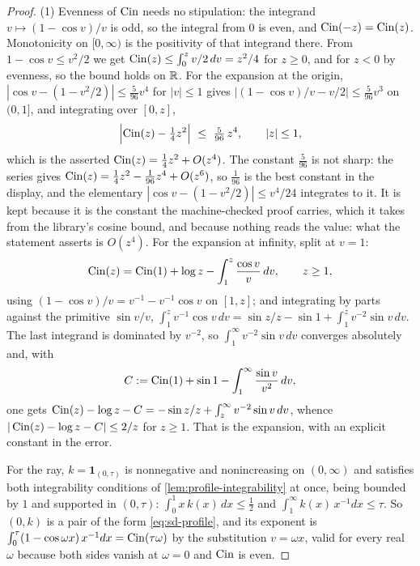 \begin{proof}
\leanok
(1) Evenness of $\operatorname{Cin}$ needs no stipulation: the integrand $v \mapsto (1 - \cos v)/v$ is odd,
so the integral from $0$ is even, and $\operatorname{Cin}(-z) = \operatorname{Cin}(z)$. Monotonicity on $[0,\infty)$ is the
positivity of that integrand there. From $1 - \cos v \le v^2/2$ we get
$\operatorname{Cin}(z) \le \int_0^z v/2\,dv = z^2/4$ for $z \ge 0$, and for $z < 0$ by evenness, so the bound
holds on $\mathbb{R}$. For the expansion at the origin, $|\cos v - (1 - v^2/2)| \le \tfrac{5}{96}v^4$
for $|v| \le 1$ gives $|(1-\cos v)/v - v/2| \le \tfrac{5}{96}v^3$ on $(0,1]$, and integrating
over $[0,z]$,
\[
  \Bigl|\Cin(z) - \tfrac14 z^2\Bigr| \ \le\ \tfrac{5}{96}\,z^4,
  \qquad |z| \le 1,
\]
which is the asserted $\operatorname{Cin}(z) = \tfrac14z^2 + O(z^4)$. The constant $\tfrac5{96}$ is not sharp:
the series gives $\operatorname{Cin}(z) = \tfrac14z^2 - \tfrac1{96}z^4 + O(z^6)$, so $\tfrac1{96}$ is the best
constant in the display, and the elementary $|\cos v - (1 - v^2/2)| \le v^4/24$ integrates to it.
It is kept because it is the constant the machine-checked proof carries, which it takes from the
library's cosine bound, and because nothing reads the value: what the statement asserts is
$O(z^4)$. For the expansion at infinity, split at
$v = 1$:
\[
  \operatorname{Cin}(z) = \operatorname{Cin}(1) + \log z - \int_1^z \frac{\cos v}{v}\,dv , \qquad z \ge 1,
\]
using $(1-\cos v)/v = v^{-1} - v^{-1}\cos v$ on $[1,z]$; and integrating by parts against the
primitive $\sin v/v$,
$\int_1^z v^{-1}\cos v\,dv = \sin z/z - \sin 1 + \int_1^z v^{-2}\sin v\,dv$. The last integrand
is dominated by $v^{-2}$, so $\int_1^\infty v^{-2}\sin v\,dv$ converges absolutely and, with
\[
  C := \operatorname{Cin}(1) + \sin 1 - \int_1^\infty \frac{\sin v}{v^2}\,dv ,
\]
one gets $\operatorname{Cin}(z) - \log z - C = -\sin z/z + \int_z^\infty v^{-2}\sin v\,dv$, whence
$|\operatorname{Cin}(z) - \log z - C| \le 2/z$ for $z \ge 1$. That is the expansion, with an explicit
constant in the error.

For the ray, $k = \mathbf 1_{(0,\tau)}$ is nonnegative and nonincreasing on $(0,\infty)$ and
satisfies both integrability conditions of \ref{lem:profile-integrability} at once, being
bounded by $1$ and supported in $(0,\tau)$: $\int_0^1 x\,k(x)\,dx \le \tfrac12$ and
$\int_1^\infty k(x)\,x^{-1}dx \le \tau$. So $(0,k)$ is a pair of the form \ref{eq:sd-profile},
and its exponent is
$\int_0^\tau (1-\cos\omega x)\,x^{-1}dx = \operatorname{Cin}(\tau\omega)$ by the substitution $v = \omega x$,
valid for every real $\omega$ because both sides vanish at $\omega = 0$ and $\operatorname{Cin}$ is even.


\end{proof}
